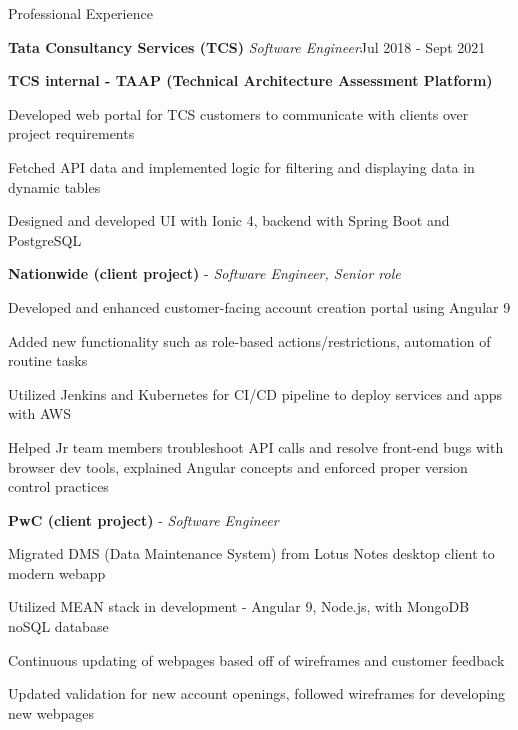\documentclass{resume} %
\begin{document}
\begin{rSection}{Professional Experience}
\vspace{-1mm}
\noindent\hspace{-1.5em}\begin{rSubsection}{\textbf{\large Tata Consultancy Services (TCS)} \normalfont \em Software Engineer}{Jul 2018 - Sept 2021}{}{}
\item[] \textbf{TCS internal - TAAP (Technical Architecture Assessment Platform)} \item
Developed web portal for TCS customers to communicate with clients over project requirements
\item Fetched API data and implemented logic for filtering and displaying data in dynamic tables
\item Designed and developed UI with Ionic 4, backend with Spring Boot and PostgreSQL
\vspace{2mm}
\item[] \textbf{Nationwide (client project)} - \normalfont \em Software Engineer, Senior role  
\vspace{0.5mm}
\normalfont
\item
Developed and enhanced customer-facing account creation portal using Angular 9
\item Added new functionality such as role-based actions/restrictions, automation of routine tasks
\item Utilized Jenkins and Kubernetes for CI/CD pipeline to deploy services and apps with AWS
\item Helped Jr team members troubleshoot API calls and resolve front-end bugs with browser dev tools, explained Angular concepts and enforced proper version control practices
\vspace{2mm}
\item[] \textbf{PwC (client project)} - \normalfont \em Software Engineer
\vspace{0.5mm}
\normalfont
\item
Migrated DMS (Data Maintenance System) from Lotus Notes desktop client to modern webapp
\item Utilized MEAN stack in development - Angular 9, Node.js, with MongoDB noSQL database
\item Continuous updating of webpages based off of wireframes and customer feedback
\item Updated validation for new account openings, followed wireframes for developing new webpages
\end{rSubsection}
\vspace{-1mm}
\end{rSection}
\end{document}
